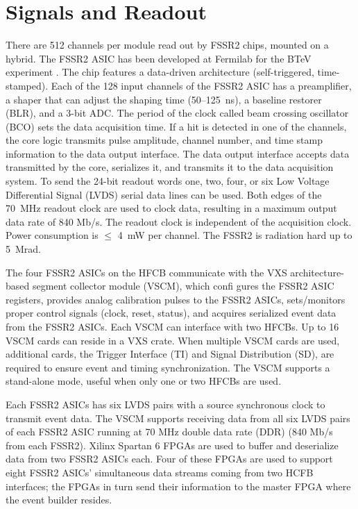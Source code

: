 \section{Signals and Readout}

There are 512 channels per module read out by FSSR2 chips, mounted on a hybrid. The FSSR2 ASIC has been developed at Fermilab for the BTeV experiment \cite{FSSR}. The chip features a data-driven architecture (self-triggered, time-stamped). Each of the 128 input channels of the FSSR2 ASIC has a preamplifier, a shaper that can adjust the shaping time (50--125~ns), a baseline restorer (BLR), and a 3-bit ADC. The period of the clock called beam crossing oscillator (BCO) sets the data acquisition time. If a hit is detected in one of the channels, the core logic transmits pulse amplitude, channel number, and time stamp information to the data output interface. The data output interface accepts data transmitted by the core, serializes it, and transmits it to the data acquisition system. To send the 24-bit readout words one, two, four, or six Low Voltage Differential Signal (LVDS) serial data lines can be used. Both edges of the 70~MHz readout clock are used to clock data, resulting in a maximum output data rate of 840 Mb/s. The readout clock is independent of the acquisition clock. Power consumption is $\le$ 4~mW per channel. The FSSR2 is radiation hard up to 5~Mrad. 

The four FSSR2 ASICs on the HFCB communicate with the VXS architecture-based segment collector module (VSCM), which confi gures the FSSR2 ASIC registers, provides analog calibration pulses to the FSSR2 ASICs, sets/monitors proper control signals (clock, reset, status), and acquires serialized event data from the FSSR2 ASICs. Each VSCM can interface with two HFCBs. Up to 16 VSCM cards can reside in a VXS crate. When multiple VSCM cards are used, additional cards, the Trigger Interface (TI) and Signal Distribution (SD), are required to ensure event and timing synchronization. The VSCM supports a stand-alone mode, useful when only one or two HFCBs are used. 

Each FSSR2 ASICs has six LVDS pairs with a source synchronous clock to transmit event data. The VSCM supports receiving data from all six LVDS pairs of each FSSR2 ASIC running at 70 MHz double data rate (DDR) (840 Mb/s from each FSSR2). Xilinx Spartan 6 FPGAs are used to buffer and deserialize data from two FSSR2 ASICs each. Four of these FPGAs are used to support eight FSSR2 ASICs' simultaneous data streams coming from two HCFB interfaces; the FPGAs in turn send their information to the master FPGA where the event builder resides.

